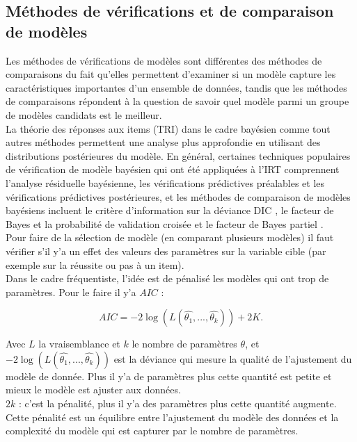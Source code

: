 \subsection{Méthodes de vérifications et de comparaison de modèles}
Les méthodes de vérifications de modèles sont différentes des méthodes de comparaisons du fait qu’elles permettent d'examiner si un modèle capture les caractéristiques importantes d'un ensemble de données, tandis que les méthodes de comparaisons répondent à la question de savoir quel modèle parmi un groupe de modèles candidats est le meilleur. \\
La théorie des réponses aux items (TRI) dans le cadre bayésien comme tout autres méthodes permettent une analyse plus approfondie en utilisant des distributions postérieures du modèle. En général, certaines techniques populaires de vérification de modèle bayésien qui ont été appliquées à l'IRT comprennent l'analyse résiduelle bayésienne, les vérifications prédictives préalables et les vérifications prédictives postérieures, et les méthodes de comparaison de modèles bayésiens incluent le critère d'information sur la déviance DIC \cite{spiegelhalter2003bayesian}, le facteur de Bayes \cite{kass1995bayes} et la probabilité de validation croisée et le facteur de Bayes partiel \cite{o1995fractional}. \\
Pour faire de la sélection de modèle (en comparant plusieurs modèles) il faut vérifier s’il y’a un effet des valeurs des paramètres sur la variable cible (par exemple sur la réussite ou pas à un item). \\
Dans le cadre fréquentiste, l’idée est de pénalisé les modèles qui ont trop de paramètres. Pour le faire il y’a \(\displaystyle AIC \)  :

\begin{equation}
	AIC = -2 \log (L(\widehat{\theta_{1}},...,\widehat{\theta_{k}} )) + 2K.
	\label{aic_formula}
\end{equation}

Avec \(\displaystyle L \) la vraisemblance et \(\displaystyle k \) le nombre de paramètres \(\displaystyle \theta \), et \\
\(\displaystyle -2 \log (L(\widehat{\theta_{1}},...,\widehat{\theta_{k}} )) \) est la déviance qui mesure la qualité de l’ajustement du modèle de donnée. Plus il y’a de paramètres plus cette quantité est petite et mieux le modèle est ajuster aux données. \\
\(\displaystyle 2k \) : c’est la pénalité, plus il y’a des paramètres plus cette quantité augmente. Cette pénalité est un équilibre entre l’ajustement du modèle des données et la complexité du modèle qui est capturer par le nombre de paramètres. \\ \\


